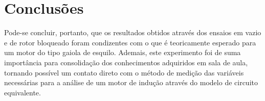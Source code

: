 \section{Conclusões}

Pode-se concluir, portanto, que os resultados obtidos através dos ensaios em vazio e de rotor bloqueado foram condizentes com o que é teoricamente esperado para um motor do tipo gaiola de esquilo. Ademais, este experimento foi de suma importância para consolidação dos conhecimentos adquiridos em sala de aula, tornando possível um contato direto com o método de medição das variáveis necessárias para a análise de um motor de indução através do modelo de circuito equivalente.

\pagebreak